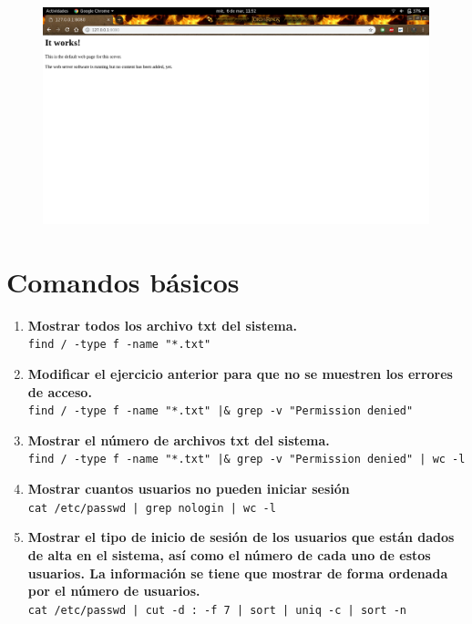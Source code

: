 \documentclass[12pt,letterpaper]{article}
\begin{document}
\begin{figure}[h]
	\centering
	\includegraphics[scale=0.34]{apache.png}
\end{figure}

\section{Comandos básicos}
\begin{enumerate}
	\item \textbf{Mostrar todos los archivo txt del sistema.} \\ \texttt{find / -type f -name "*.txt"}
	\item \textbf{Modificar el ejercicio anterior para que no se muestren los errores de acceso.} \\ \texttt{find / -type f -name "*.txt" |\& grep -v "Permission denied"}
	\item \textbf{Mostrar el número de archivos txt del sistema.} \\ \texttt{find / -type f -name "*.txt" |\& grep -v "Permission denied" | wc -l}
	\item \textbf{Mostrar cuantos usuarios no pueden iniciar sesión} \\ \texttt{cat /etc/passwd | grep nologin | wc -l}
	\item \textbf{Mostrar el tipo de inicio de sesión de los usuarios que están dados de alta en el sistema, así como el número de cada uno de estos usuarios. La información se tiene que mostrar de forma ordenada por el número de usuarios.} \\ \texttt{cat /etc/passwd | cut -d : -f 7 | sort | uniq -c | sort -n}
\end{enumerate}
\end{document}
